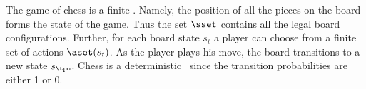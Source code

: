 \begin{example}[Chess] \label{ex: chess as MDP}
The game of chess is a finite \mdpS.
Namely, the position of all the pieces on the board forms the state of the game. Thus the set $\sset$ contains all the legal board configurations.
Further, for each board state $s_t$ a player can choose from a finite set of actions $\aset(s_t)$. As the player plays his move, the board transitions to a new state $s_\tpo$.
Chess is a deterministic \mdpS~since the transition probabilities are either 1 or 0.
\end{example}